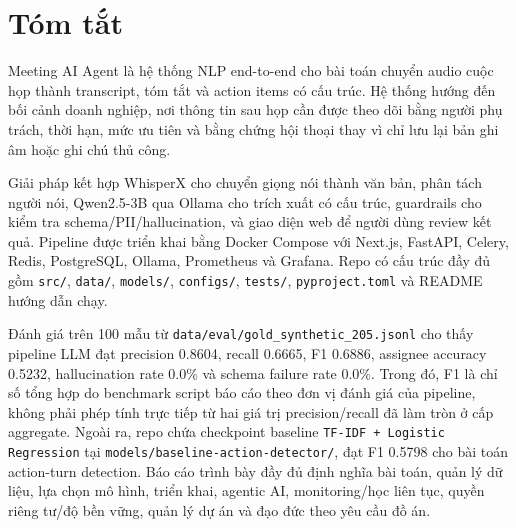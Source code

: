 \chapter*{Tóm tắt}

Meeting AI Agent là hệ thống NLP end-to-end cho bài toán chuyển audio cuộc họp thành transcript, tóm tắt và action items có cấu trúc. Hệ thống hướng đến bối cảnh doanh nghiệp, nơi thông tin sau họp cần được theo dõi bằng người phụ trách, thời hạn, mức ưu tiên và bằng chứng hội thoại thay vì chỉ lưu lại bản ghi âm hoặc ghi chú thủ công.

Giải pháp kết hợp WhisperX cho chuyển giọng nói thành văn bản, phân tách người nói, Qwen2.5-3B qua Ollama cho trích xuất có cấu trúc, guardrails cho kiểm tra schema/PII/hallucination, và giao diện web để người dùng review kết quả. Pipeline được triển khai bằng Docker Compose với Next.js, FastAPI, Celery, Redis, PostgreSQL, Ollama, Prometheus và Grafana. Repo có cấu trúc đầy đủ gồm \texttt{src/}, \texttt{data/}, \texttt{models/}, \texttt{configs/}, \texttt{tests/}, \texttt{pyproject.toml} và README hướng dẫn chạy.

Đánh giá trên 100 mẫu từ \texttt{data/eval/gold\_synthetic\_205.jsonl} cho thấy pipeline LLM đạt precision 0.8604, recall 0.6665, F1 0.6886, assignee accuracy 0.5232, hallucination rate 0.0\% và schema failure rate 0.0\%. Trong đó, F1 là chỉ số tổng hợp do benchmark script báo cáo theo đơn vị đánh giá của pipeline, không phải phép tính trực tiếp từ hai giá trị precision/recall đã làm tròn ở cấp aggregate. Ngoài ra, repo chứa checkpoint baseline \texttt{TF-IDF + Logistic Regression} tại \texttt{models/baseline-action-detector/}, đạt F1 0.5798 cho bài toán action-turn detection. Báo cáo trình bày đầy đủ định nghĩa bài toán, quản lý dữ liệu, lựa chọn mô hình, triển khai, agentic AI, monitoring/học liên tục, quyền riêng tư/độ bền vững, quản lý dự án và đạo đức theo yêu cầu đồ án.
